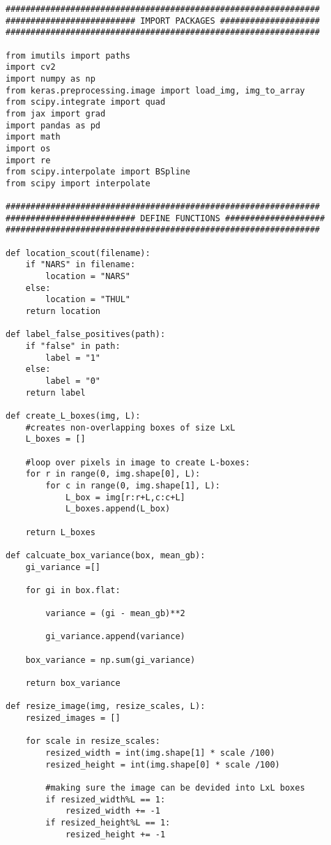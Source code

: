 \documentclass[12pt]{article}
\begin{document}
\begin{verbatim}
###############################################################
########################## IMPORT PACKAGES ####################
###############################################################

from imutils import paths
import cv2
import numpy as np
from keras.preprocessing.image import load_img, img_to_array
from scipy.integrate import quad
from jax import grad
import pandas as pd
import math
import os
import re
from scipy.interpolate import BSpline
from scipy import interpolate

###############################################################
########################## DEFINE FUNCTIONS ####################
###############################################################

def location_scout(filename):
    if "NARS" in filename:
        location = "NARS"
    else:
        location = "THUL"
    return location

def label_false_positives(path):
    if "false" in path:
        label = "1"
    else:
        label = "0"
    return label

def create_L_boxes(img, L):
    #creates non-overlapping boxes of size LxL
    L_boxes = []

    #loop over pixels in image to create L-boxes:
    for r in range(0, img.shape[0], L):
        for c in range(0, img.shape[1], L):
            L_box = img[r:r+L,c:c+L]
            L_boxes.append(L_box)

    return L_boxes

def calcuate_box_variance(box, mean_gb):
    gi_variance =[]

    for gi in box.flat:

        variance = (gi - mean_gb)**2

        gi_variance.append(variance)

    box_variance = np.sum(gi_variance)

    return box_variance

def resize_image(img, resize_scales, L):
    resized_images = []

    for scale in resize_scales:
        resized_width = int(img.shape[1] * scale /100) 
        resized_height = int(img.shape[0] * scale /100) 

        #making sure the image can be devided into LxL boxes
        if resized_width%L == 1:
            resized_width += -1
        if resized_height%L == 1:
            resized_height += -1
        

\end{verbatim}
\end{document}
